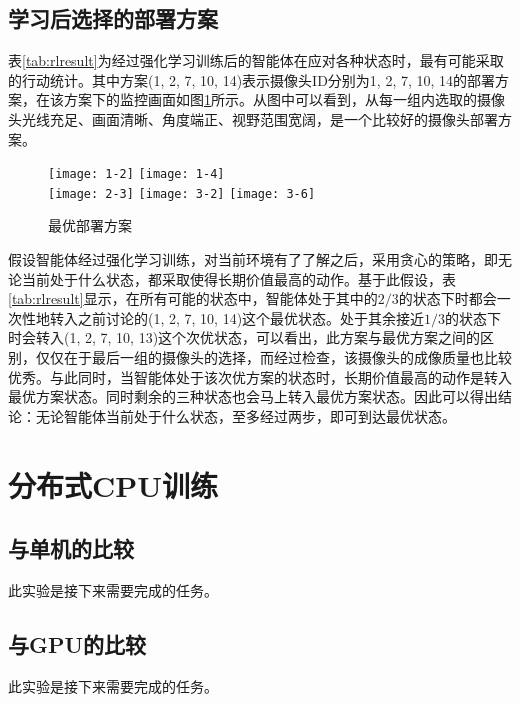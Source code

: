\subsection{学习后选择的部署方案}

表\ref{tab:rlresult}为经过强化学习训练后的智能体在应对各种状态时，最有可能采取的行动统计。其中方案(1, 2, 7, 10, 14)表示摄像头ID分别为1, 2, 7, 10, 14的部署方案，在该方案下的监控画面如图\ref{fig:rlresult}所示。从图中可以看到，从每一组内选取的摄像头光线充足、画面清晰、角度端正、视野范围宽阔，是一个比较好的摄像头部署方案。

\begin{figure}
\centering
\texttt{[image: 1-2]}
\texttt{[image: 1-4]}\\
\texttt{[image: 2-3]}
\texttt{[image: 3-2]}
\texttt{[image: 3-6]}
\caption{最优部署方案}
\label{fig:rlresult}
\end{figure}

假设智能体经过强化学习训练，对当前环境有了了解之后，采用贪心的策略，即无论当前处于什么状态，都采取使得长期价值最高的动作。基于此假设，表\ref{tab:rlresult}显示，在所有可能的状态中，智能体处于其中的$2/3$的状态下时都会一次性地转入之前讨论的(1, 2, 7, 10, 14)这个最优状态。处于其余接近$1/3$的状态下时会转入(1, 2, 7, 10, 13)这个次优状态，可以看出，此方案与最优方案之间的区别，仅仅在于最后一组的摄像头的选择，而经过检查，该摄像头的成像质量也比较优秀。与此同时，当智能体处于该次优方案的状态时，长期价值最高的动作是转入最优方案状态。同时剩余的三种状态也会马上转入最优方案状态。因此可以得出结论：无论智能体当前处于什么状态，至多经过两步，即可到达最优状态。

\section{分布式CPU训练}

\subsection{与单机的比较}

此实验是接下来需要完成的任务。

\subsection{与GPU的比较}

此实验是接下来需要完成的任务。